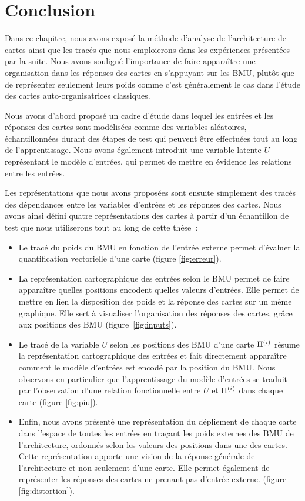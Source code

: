 \documentclass[../main]{subfiles}
\begin{document}
\section{Conclusion}

Dans ce chapitre, nous avons exposé la méthode d'analyse de l'architecture de cartes ainsi que les tracés que nous emploierons dans les expériences présentées par la suite. 
Nous avons souligné l'importance de faire apparaître une organisation dans les réponses des cartes en s'appuyant sur les BMU, plutôt que de représenter seulement leurs poids comme c'est généralement le cas dans l'étude des cartes auto-organisatrices classiques.

Nous avons d'abord proposé un cadre d'étude dans lequel les entrées et les réponses des cartes sont modélisées comme des variables aléatoires, échantillonnées durant des étapes de test qui peuvent être effectuées tout au long de l'apprentissage.
Nous avons également introduit une variable latente $U$ représentant le modèle d'entrées, qui permet de mettre en évidence les relations entre les entrées.


Les représentations que nous avons proposées sont ensuite simplement des tracés des dépendances entre les variables d'entrées et les réponses des cartes. Nous avons ainsi défini quatre représentations des cartes à partir d'un échantillon de test que nous utiliserons tout au long de cette thèse~:
\begin{itemize}
    \item Le tracé du poids du BMU en fonction de l'entrée externe permet d'évaluer la quantification vectorielle d'une carte (figure \ref{fig:erreur}).
    \item La représentation cartographique des entrées selon le BMU permet de faire apparaître quelles positions encodent quelles valeurs d'entrées. Elle permet de mettre en lien la disposition des poids et la réponse des cartes sur un même graphique. Elle sert à visualiser l'organisation des réponses des cartes, grâce aux positions des BMU (figure~\ref{fig:inputs}).
    \item Le tracé de la variable $U$ selon les positions des BMU d'une carte $\Pi^{({i})}$ résume la représentation cartographique des entrées et fait directement apparaître comment le modèle d'entrées est encodé par la position du BMU.
    Nous observons en particulier que l'apprentissage du modèle d'entrées se traduit par l'observation d'une relation fonctionnelle entre $U$ et $\Pi^{({i})}$ dans chaque carte (figure \ref{fig:piu}).
    \item Enfin, nous avons présenté une représentation du dépliement de chaque carte dans l'espace de toutes les entrées en traçant les poids externes des BMU de l'architecture, ordonnés selon les valeurs des positions dans une des cartes. Cette représentation apporte une vision de la réponse générale de l'architecture et non seulement d'une carte. Elle permet également de représenter les réponses des cartes ne prenant pas d'entrée externe. (figure \ref{fig:distortion}).
\end{itemize}
\end{document}
